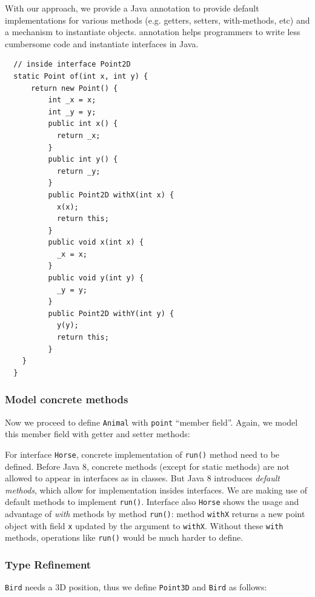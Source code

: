 With our approach, we provide a Java annotation \mixin to provide default
implementations for various methods (e.g. getters, setters, with-methods, etc)
and a mechanism to instantiate objects. \mixin annotation helps programmers to
write less cumbersome code and instantiate interfaces in Java.

\begin{lstlisting}
  // inside interface Point2D
  static Point of(int x, int y) {
      return new Point() {
          int _x = x;
          int _y = y;
          public int x() {
            return _x;
          }
          public int y() {
            return _y;
          }
          public Point2D withX(int x) {
            x(x);
            return this;
          }
          public void x(int x) {
            _x = x;
          }
          public void y(int y) {
            _y = y;
          }
          public Point2D withY(int y) {
            y(y);
            return this;
          }
    }
  }
\end{lstlisting}


\subsubsection{Model concrete methods}
Now we proceed to define \texttt{Animal} with \texttt{point} ``member
field''. Again, we model this member field with getter and setter methods:

For interface \texttt{Horse}, concrete implementation of \texttt{run()} method
need to be defined. Before Java 8, concrete methods (except for static methods)
are not allowed to appear in interfaces as in classes. But Java 8 introduces
\emph{default methods}, which allow for implementation insides interfaces. We
are making use of default methods to implement \texttt{run()}.  Interface also
\texttt{Horse} shows the usage and advantage of \emph{with} methods by method
\texttt{run()}: method \texttt{withX} returns a new point object with field
\texttt{x} updated by the argument to \texttt{withX}. Without these
\texttt{with} methods, operations like \texttt{run()} would be much harder to
define.

\subsubsection{Type Refinement}
\texttt{Bird} needs a 3D position, thus we define \texttt{Point3D} and
\texttt{Bird} as follows:


